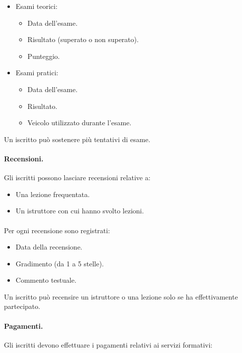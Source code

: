 \documentclass[10pt,twoside]{article}
\begin{document}
{    \begin{itemize}
        \item Esami teorici:
        \begin{itemize}
            \item Data dell’esame.
            \item Risultato (superato o non superato).
            \item Punteggio.
        \end{itemize}
        \item Esami pratici:
        \begin{itemize}
            \item Data dell’esame.
            \item Risultato.
            \item Veicolo utilizzato durante l’esame.
        \end{itemize}
    \end{itemize}

    Un iscritto può sostenere più tentativi di esame.


    \paragraph{Recensioni.}
    Gli iscritti possono lasciare recensioni relative a:

    \begin{itemize}
        \item Una lezione frequentata.
        \item Un istruttore con cui hanno svolto lezioni.
    \end{itemize}

    \paragraph{}
    Per ogni recensione sono registrati:

    \begin{itemize}
        \item Data della recensione.
        \item Gradimento (da 1 a 5 stelle).
        \item Commento testuale.
    \end{itemize}

    Un iscritto può recensire un istruttore o una lezione solo se ha effettivamente partecipato.


    \paragraph{Pagamenti.}
    Gli iscritti devono effettuare i pagamenti relativi ai servizi formativi:

}
\end{document}
